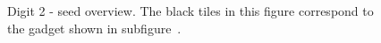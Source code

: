 \begin{figure}[H]
{        Digit 2 - seed overview.
        The black tiles in this figure correspond to the gadget shown in subfigure~.
        \label{fig:next_read_2_seed_op_overview}
    }{}%
    ~
\end{figure}

